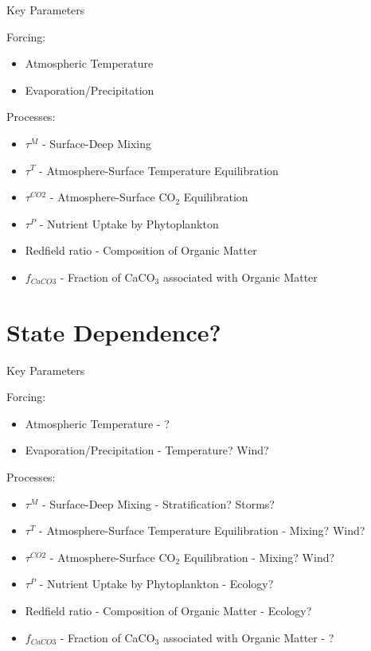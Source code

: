 \begin{frame}{Key Parameters}
    
    Forcing:
    \begin{itemize}
        \item Atmospheric Temperature
        \item Evaporation/Precipitation
    \end{itemize}

    Processes:
    \begin{itemize}
        \item $\tau^M$ - Surface-Deep Mixing
        \item $\tau^T$ - Atmosphere-Surface Temperature Equilibration
        \item $\tau^{CO2}$ - Atmosphere-Surface CO$_2$ Equilibration
        \item $\tau^P$ - Nutrient Uptake by Phytoplankton
        \item Redfield ratio - Composition of Organic Matter
        \item $f_{CaCO3}$ - Fraction of CaCO$_3$ associated with Organic Matter
    \end{itemize}

\end{frame}

\section{State Dependence?}

\begin{frame}{Key Parameters}
    
    Forcing:
    \begin{itemize}
        \item Atmospheric Temperature - {\color{QESdarkblue} ?}
        \item Evaporation/Precipitation - {\color{QESdarkblue} Temperature? Wind?}
    \end{itemize}

    Processes:
    \begin{itemize}
        \item $\tau^M$ - Surface-Deep Mixing - {\color{QESdarkblue} Stratification? Storms?}
        \item $\tau^T$ - Atmosphere-Surface Temperature Equilibration - {\color{QESdarkblue} Mixing? Wind?}
        \item $\tau^{CO2}$ - Atmosphere-Surface CO$_2$ Equilibration - {\color{QESdarkblue} Mixing? Wind?}
        \item $\tau^P$ - Nutrient Uptake by Phytoplankton - {\color{QESdarkblue} Ecology?}
        \item Redfield ratio - Composition of Organic Matter - {\color{QESdarkblue} Ecology?}
        \item $f_{CaCO3}$ - Fraction of CaCO$_3$ associated with Organic Matter - {\color{QESdarkblue} \ce{\Omega}?}
    \end{itemize}

\end{frame}

